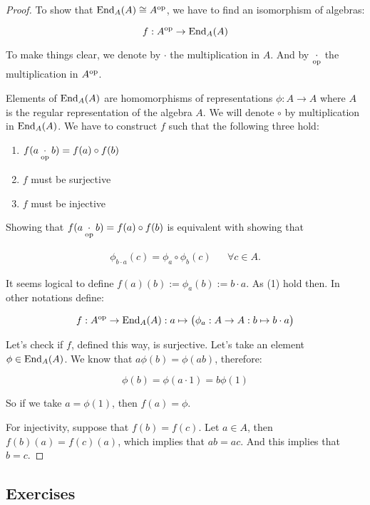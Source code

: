 \begin{proof} To show that \(\operatorname{End}_{A} (A) \cong  A^{\operatorname{op}}\), we have to find an isomorphism of algebras:

\[f :A^{\operatorname{op}} \rightarrow  \operatorname{End}_{A} (A) \]

To make things clear, we denote by \(\cdot \) the multiplication in \(A\). And by \(\underset{\operatorname{op}}{\cdot }\) the multiplication in \(A^{\operatorname{op}}\).

Elements of \(\operatorname{End}_{A} (A)\) are homomorphisms of representations \(\phi : A\rightarrow A\) where \(A\) is the regular representation of the algebra \(A\). We will denote \(\circ \) by multiplication in \(\operatorname{End}_{A} (A)\). We have to construct \(f\) such that the following three hold:

\begin{enumerate}
\item \(f(a\underset{\operatorname{op}}{\cdot }b)=f(a) \circ f(b)\)
\item \(f\) must be surjective
\item \(f\) must be injective
\end{enumerate}

Showing that  \(f(a\underset{\operatorname{op}}{\cdot }b)=f(a) \circ f(b)\) is equivalent with showing that

\begin{align*}\phi _{b\cdot a} (c) =\phi _{a}\circ \phi _{b}(c) && \forall c \in  A.\end{align*}

It seems logical to define \(f(a)(b):=\phi _{a}(b):=b\cdot a\). As (1) hold then. In other notations define:

\[f :A^{\operatorname{op}} \rightarrow  \operatorname{End}_{A} (A) : a \mapsto \big(\phi _{a} : A \rightarrow  A:b \mapsto b\cdot a\big)\]

Let's check if \(f\), defined this way, is surjective. Let's take an element \(\phi \in  \operatorname{End}_{A} (A)\). We know that \(a\phi (b)=\phi (ab)\), therefore:

\[\phi (b)=\phi (a\cdot 1)=b\phi (1)\]

So if we take \(a=\phi (1)\), then \(f(a)=\phi \).

For injectivity, suppose that \(f(b)=f(c)\). Let \(a\in A\), then \(f(b)(a)=f(c)(a)\), which implies that \(ab=ac\). And this implies that $b=c$.
\end{proof}

\subsection*{Exercises}

